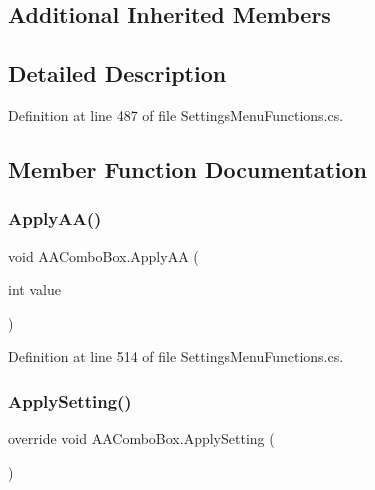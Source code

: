 \subsection*{Additional Inherited Members}


\subsection{Detailed Description}


Definition at line 487 of file Settings\+Menu\+Functions.\+cs.



\subsection{Member Function Documentation}
\mbox{\label{class_a_a_combo_box_a40b74d46ece795c636696452516f44ad}} 
\subsubsection{\texorpdfstring{Apply\+A\+A()}{ApplyAA()}}
{\footnotesize\ttfamily void A\+A\+Combo\+Box.\+Apply\+AA (\begin{DoxyParamCaption}\item[{int}]{value }\end{DoxyParamCaption})}



Definition at line 514 of file Settings\+Menu\+Functions.\+cs.

\mbox{\label{class_a_a_combo_box_a449a6201d1e2c9e612b49bce29c1c151}} 
\subsubsection{\texorpdfstring{Apply\+Setting()}{ApplySetting()}}
{\footnotesize\ttfamily override void A\+A\+Combo\+Box.\+Apply\+Setting (\begin{DoxyParamCaption}{ }\end{DoxyParamCaption})\hspace{0.3cm}{\ttfamily [virtual]}}




